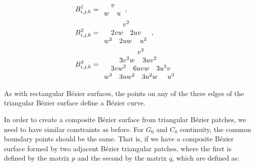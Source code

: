 \begin{align}
B^1_{i,j,k} &= \begin{array}{cccc}
& \multicolumn{2}{c}{v} & \\
\multicolumn{2}{c}{w} & \multicolumn{2}{c}{u}
\end{array},\\
B^2_{i,j,k} &= \begin{array}{cccccc}
\multicolumn{6}{c}{v^2} \\
& \multicolumn{2}{c}{2vw} & \multicolumn{2}{c}{2uv} & \\
\multicolumn{2}{c}{w^2} & \multicolumn{2}{c}{2uw} & \multicolumn{2}{c}{u^2}
\end{array},\\
B^3_{i,j,k} &= \begin{array}{cccccccc}
\multicolumn{8}{c}{v^3} \\
&& \multicolumn{2}{c}{3v^2w} & \multicolumn{2}{c}{3uv^2} && \\
& \multicolumn{2}{c}{3vw^2} & \multicolumn{2}{c}{6uvw} & \multicolumn{2}{c}{3u^2v} & \\
\multicolumn{2}{c}{w^3} & \multicolumn{2}{c}{3uw^2} & \multicolumn{2}{c}{3u^2w} & \multicolumn{2}{c}{u^3}
\end{array}
\end{align}

As with rectangular B\'ezier surfaces, the points on any of the three edges of the triangular B\'ezier surface define a B\'ezier curve.

In order to create a composite B\'ezier surface from triangular B\'ezier patches, we need to have similar constraints as before.
For \(G_0\) and \(C_0\) continuity, the common boundary points should be the same.
That is, if we have a composite B\'ezier surface formed by two adjacent B\'ezier triangular patches, where the first is defined by the matrix \(p\) and the second by the matrix \(q\), which are defined as:

